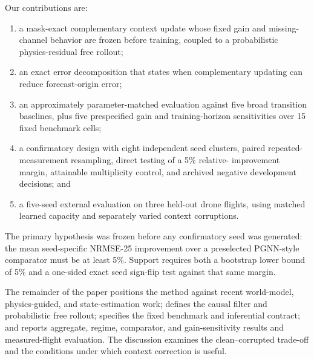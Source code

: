 Our contributions are:
\begin{enumerate}
 \item a mask-exact complementary context update whose fixed gain and missing-
 channel behavior are frozen before training, coupled to a probabilistic
 physics-residual free rollout;
 \item an exact error decomposition that states when complementary updating can
 reduce forecast-origin error;
 \item an approximately parameter-matched evaluation against five broad
 transition baselines, plus five prespecified gain and training-horizon
 sensitivities over 15 fixed benchmark cells;
 \item a confirmatory design with eight independent seed clusters,
 paired repeated-measurement resampling, direct testing of a 5\% relative-
 improvement margin, attainable multiplicity control, and archived negative
 development decisions; and
 \item a five-seed external evaluation on three held-out drone flights, using
 matched learned capacity and separately varied context corruptions.
\end{enumerate}

The primary hypothesis was frozen before any confirmatory seed was generated:
the mean seed-specific NRMSE-25 improvement over a preselected PGNN-style comparator
must be at least 5\%. Support requires both a bootstrap lower bound of 5\% and a
one-sided exact seed sign-flip test against that same margin.

The remainder of the paper positions the method against recent world-model,
physics-guided, and state-estimation work; defines the causal filter and
probabilistic free rollout; specifies the fixed benchmark and inferential
contract; and reports aggregate, regime, comparator, and gain-sensitivity
results and measured-flight evaluation. The discussion examines the clean--corrupted trade-off and the
conditions under which context correction is useful.
